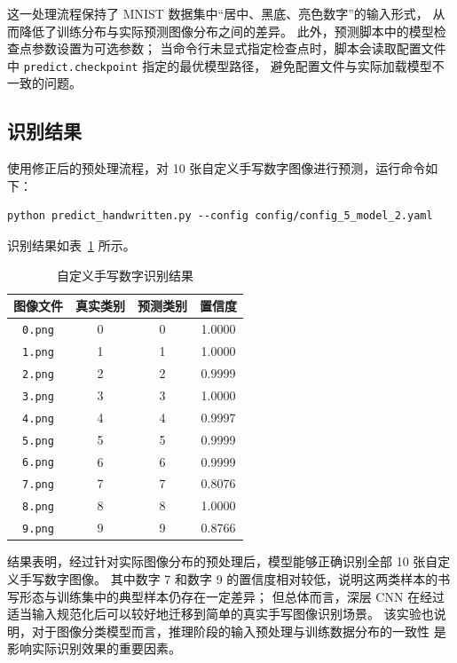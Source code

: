 \documentclass[UTF8,a4paper,12pt]{ctexart}
\begin{document}
这一处理流程保持了 MNIST 数据集中“居中、黑底、亮色数字”的输入形式，
从而降低了训练分布与实际预测图像分布之间的差异。
此外，预测脚本中的模型检查点参数设置为可选参数；
当命令行未显式指定检查点时，脚本会读取配置文件中 \texttt{predict.checkpoint} 指定的最优模型路径，
避免配置文件与实际加载模型不一致的问题。

\subsection{识别结果}

使用修正后的预处理流程，对 10 张自定义手写数字图像进行预测，运行命令如下：

\begin{verbatim}
python predict_handwritten.py --config config/config_5_model_2.yaml
\end{verbatim}

识别结果如表~\ref{tab:handwritten_results} 所示。

\begin{table}[H]
    \centering
    \caption{自定义手写数字识别结果}
    \label{tab:handwritten_results}
    \begin{tabular}{cccc}
        \toprule
        图像文件 & 真实类别 & 预测类别 & 置信度 \\
        \midrule
        \texttt{0.png} & 0 & 0 & 1.0000 \\
        \texttt{1.png} & 1 & 1 & 1.0000 \\
        \texttt{2.png} & 2 & 2 & 0.9999 \\
        \texttt{3.png} & 3 & 3 & 1.0000 \\
        \texttt{4.png} & 4 & 4 & 0.9997 \\
        \texttt{5.png} & 5 & 5 & 0.9999 \\
        \texttt{6.png} & 6 & 6 & 0.9999 \\
        \texttt{7.png} & 7 & 7 & 0.8076 \\
        \texttt{8.png} & 8 & 8 & 1.0000 \\
        \texttt{9.png} & 9 & 9 & 0.8766 \\
        \bottomrule
    \end{tabular}
\end{table}

结果表明，经过针对实际图像分布的预处理后，模型能够正确识别全部 10 张自定义手写数字图像。
其中数字 7 和数字 9 的置信度相对较低，说明这两类样本的书写形态与训练集中的典型样本仍存在一定差异；
但总体而言，深层 CNN 在经过适当输入规范化后可以较好地迁移到简单的真实手写图像识别场景。
该实验也说明，对于图像分类模型而言，推理阶段的输入预处理与训练数据分布的一致性
是影响实际识别效果的重要因素。
\end{document}
